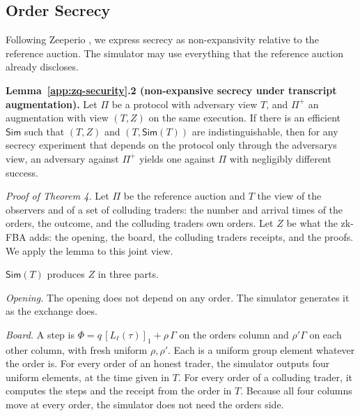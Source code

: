 \subsection{Order Secrecy}
\label{app:zq-secrecy-proof}

Following Zeeperio \cite{MEC26}, we express secrecy as non-expansivity relative to the reference auction. The simulator may use everything that the reference auction already discloses.

\textbf{Lemma~\ref{app:zq-security}.2 (non-expansive secrecy under transcript augmentation).} Let \(\Pi\) be a protocol with adversary view \(T\), and \(\Pi^+\) an augmentation with view \((T, Z)\) on the same execution. If there is an efficient \(\mathsf{Sim}\) such that \((T, Z)\) and \((T, \mathsf{Sim}(T))\) are indistinguishable, then for any secrecy experiment that depends on the protocol only through the adversary\textquotesingle s view, an adversary against \(\Pi^+\) yields one against \(\Pi\) with negligibly different success.

\emph{Proof of Theorem 4.} Let \(\Pi\) be the reference auction and \(T\) the view of the observers and of a set of colluding traders: the number and arrival times of the orders, the outcome, and the colluding traders\textquotesingle{} own orders. Let \(Z\) be what the zk-FBA adds: the opening, the board, the colluding traders\textquotesingle{} receipts, and the proofs. We apply the lemma to this joint view.

\(\mathsf{Sim}(T)\) produces \(Z\) in three parts.

\emph{Opening.} The opening does not depend on any order. The simulator generates it as the exchange does.

\emph{Board.} A step is \(\Phi = q\,[L_\ell(\tau)]_1 + \rho\,\Gamma\) on the order\textquotesingle s column and \(\rho'\Gamma\) on each other column, with fresh uniform \(\rho, \rho'\). Each is a uniform group element whatever the order is. For every order of an honest trader, the simulator outputs four uniform elements, at the time given in \(T\). For every order of a colluding trader, it computes the steps and the receipt from the order in \(T\). Because all four columns move at every order, the simulator does not need the order\textquotesingle s side.

